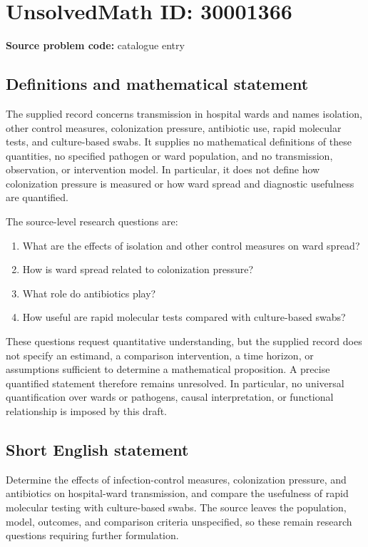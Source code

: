 \documentclass[11pt]{article}
\begin{document}
\section*{UnsolvedMath ID: 30001366}
\textbf{Source problem code:} catalogue entry
\subsection{Definitions and mathematical statement}
The supplied record concerns transmission in hospital wards and names isolation, other control measures, colonization pressure, antibiotic use, rapid molecular tests, and culture-based swabs. It supplies no mathematical definitions of these quantities, no specified pathogen or ward population, and no transmission, observation, or intervention model. In particular, it does not define how colonization pressure is measured or how ward spread and diagnostic usefulness are quantified.

The source-level research questions are:
\begin{enumerate}
\item What are the effects of isolation and other control measures on ward spread?
\item How is ward spread related to colonization pressure?
\item What role do antibiotics play?
\item How useful are rapid molecular tests compared with culture-based swabs?
\end{enumerate}
These questions request quantitative understanding, but the supplied record does not specify an estimand, a comparison intervention, a time horizon, or assumptions sufficient to determine a mathematical proposition. A precise quantified statement therefore remains unresolved. In particular, no universal quantification over wards or pathogens, causal interpretation, or functional relationship is imposed by this draft.
\subsection{Short English statement}
Determine the effects of infection-control measures, colonization pressure, and antibiotics on hospital-ward transmission, and compare the usefulness of rapid molecular testing with culture-based swabs. The source leaves the population, model, outcomes, and comparison criteria unspecified, so these remain research questions requiring further formulation.
\end{document}
